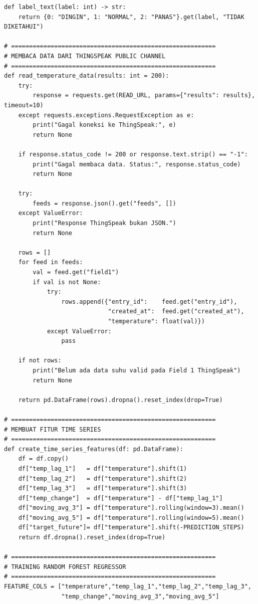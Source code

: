 \begin{lstlisting}[style=pythonstyle,
    caption={Program Python AI Random Forest Regressor untuk Prediksi Suhu 1 Menit},
    label={lst:python}]
def label_text(label: int) -> str:
    return {0: "DINGIN", 1: "NORMAL", 2: "PANAS"}.get(label, "TIDAK DIKETAHUI")

# =========================================================
# MEMBACA DATA DARI THINGSPEAK PUBLIC CHANNEL
# =========================================================
def read_temperature_data(results: int = 200):
    try:
        response = requests.get(READ_URL, params={"results": results}, timeout=10)
    except requests.exceptions.RequestException as e:
        print("Gagal koneksi ke ThingSpeak:", e)
        return None

    if response.status_code != 200 or response.text.strip() == "-1":
        print("Gagal membaca data. Status:", response.status_code)
        return None

    try:
        feeds = response.json().get("feeds", [])
    except ValueError:
        print("Response ThingSpeak bukan JSON.")
        return None

    rows = []
    for feed in feeds:
        val = feed.get("field1")
        if val is not None:
            try:
                rows.append({"entry_id":    feed.get("entry_id"),
                             "created_at":  feed.get("created_at"),
                             "temperature": float(val)})
            except ValueError:
                pass

    if not rows:
        print("Belum ada data suhu valid pada Field 1 ThingSpeak")
        return None

    return pd.DataFrame(rows).dropna().reset_index(drop=True)

# =========================================================
# MEMBUAT FITUR TIME SERIES
# =========================================================
def create_time_series_features(df: pd.DataFrame):
    df = df.copy()
    df["temp_lag_1"]   = df["temperature"].shift(1)
    df["temp_lag_2"]   = df["temperature"].shift(2)
    df["temp_lag_3"]   = df["temperature"].shift(3)
    df["temp_change"]  = df["temperature"] - df["temp_lag_1"]
    df["moving_avg_3"] = df["temperature"].rolling(window=3).mean()
    df["moving_avg_5"] = df["temperature"].rolling(window=5).mean()
    df["target_future"]= df["temperature"].shift(-PREDICTION_STEPS)
    return df.dropna().reset_index(drop=True)

# =========================================================
# TRAINING RANDOM FOREST REGRESSOR
# =========================================================
FEATURE_COLS = ["temperature","temp_lag_1","temp_lag_2","temp_lag_3",
                "temp_change","moving_avg_3","moving_avg_5"]


\end{lstlisting}
